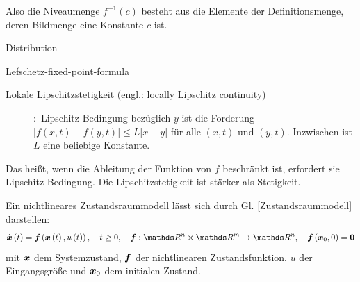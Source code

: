 \vspace{-0.8em}
Also die Niveaumenge $f^{-1}\left ( c \right )$ besteht aus die Elemente der Definitionsmenge, deren Bildmenge eine Konstante $c$ ist.
\begin{description}
	\item[Distribution]
\end{description}
\begin{description}
	\item[Lefschetz-fixed-point-formula]
\end{description}
\begin{description}
	\item[Lokale Lipschitzstetigkeit (engl.: locally Lipschitz continuity)]
	\cite[S.553]{bronstein2012taschenbuch}:~Lipschitz-Bedingung bezüglich $y$ ist die Forderung $\left | f\left ( x,t \right ) -f\left ( y,t \right )\right |\leq L\left | x-y \right |$ für alle $\left ( x,t \right )$ und $\left ( y,t \right )$. Inzwischen ist $L$ eine beliebige Konstante.
\end{description}
\vspace{-0.8em}
Das heißt, wenn die Ableitung der Funktion von $f$ beschränkt ist, erfordert sie Lipschitz-Bedingung. Die Lipschitzstetigkeit ist stärker als Stetigkeit.












Ein nichtlineares Zustandsraummodell lässt sich durch Gl. \ref{Zustandsraummodell} darstellen:
\begin{eqnarray}
\dot{\vect{x}}\left ( t \right )=\vect{f}\left (\vect{x}\left ( t \right ),u\left ( t \right )  \right ),~~~t\geq 0,~~~\vect{f}:\Reals^{n}\times\Reals^{m}\to\Reals^{n},~~~\vect{f}\left ({\vect{x}_{0}},0  \right )=\vect{0}
\label{Zustandsraummodell}
\end{eqnarray}
mit $\boldsymbol x$ dem Systemzustand, $\boldsymbol f$ der nichtlinearen Zustandsfunktion, $u$ der Eingangsgröße und $\boldsymbol x_{0}$ dem initialen Zustand. 

